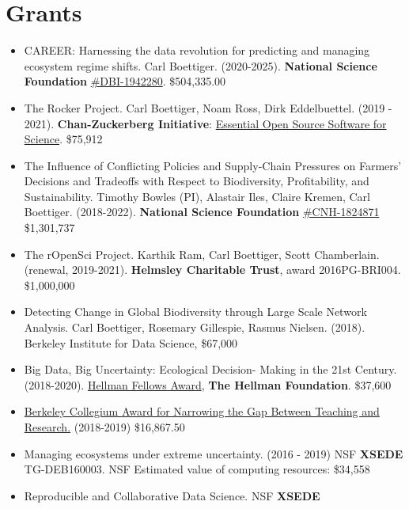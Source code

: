 \documentclass[10pt,sans]{moderncv}        %
\begin{document}
\hypertarget{grants}{%
\section{Grants}\label{grants}}

\begin{itemize}
\item
  CAREER: Harnessing the data revolution for predicting and managing
  ecosystem regime shifts. Carl Boettiger. (2020-2025). \textbf{National
  Science Foundation}
  \href{https://www.nsf.gov/awardsearch/showAward?AWD_ID=1942280}{\#DBI-1942280}.
  \$504,335.00
\item
  The Rocker Project. Carl Boettiger, Noam Ross, Dirk Eddelbuettel.
  (2019 - 2021). \textbf{Chan-Zuckerberg Initiative}:
  \href{https://chanzuckerberg.com/eoss/proposals/maintaining-rocker-sustainability-for-containerized-reproducible-analyses/}{Essential
  Open Source Software for Science}. \$75,912
\item
  The Influence of Conflicting Policies and Supply-Chain Pressures on
  Farmers' Decisions and Tradeoffs with Respect to Biodiversity,
  Profitability, and Sustainability. Timothy Bowles (PI), Alastair Iles,
  Claire Kremen, Carl Boettiger. (2018-2022). \textbf{National Science
  Foundation}
  \href{https://nsf.gov/awardsearch/showAward?AWD_ID=1824871}{\#CNH-1824871}
  \$1,301,737
\item
  The rOpenSci Project. Karthik Ram, Carl Boettiger, Scott Chamberlain.
  (renewal, 2019-2021). \textbf{Helmsley Charitable Trust}, award
  2016PG-BRI004. \$1,000,000
\item
  Detecting Change in Global Biodiversity through Large Scale Network
  Analysis. Carl Boettiger, Rosemary Gillespie, Rasmus Nielsen. (2018).
  Berkeley Institute for Data Science, \$67,000
\item
  Big Data, Big Uncertainty: Ecological Decision- Making in the 21st
  Century. (2018-2020).
  \href{https://vpf.berkeley.edu/hellman-fellows-fund}{Hellman Fellows
  Award}, \textbf{The Hellman Foundation}. \$37,600
\item
  \href{http://collegium.berkeley.edu/}{Berkeley Collegium Award for
  Narrowing the Gap Between Teaching and Research.} (2018-2019)
  \$16,867.50
\item
  Managing ecosystems under extreme uncertainty. (2016 - 2019) NSF
  \textbf{XSEDE} TG-DEB160003. NSF Estimated value of computing
  resources: \$34,558
\item
  Reproducible and Collaborative Data Science. NSF \textbf{XSEDE}

\end{itemize}
\end{document}
